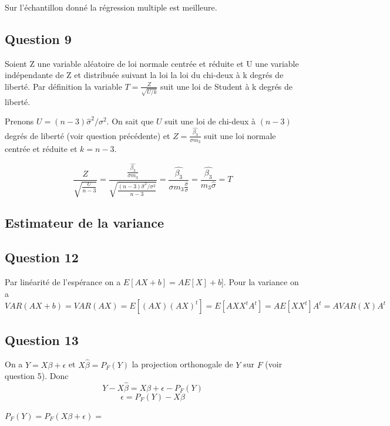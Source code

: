 \documentclass[]{book}
\theoremstyle{definition}
\begin{document}
Sur l'\'echantillon donn\'e la r\'egression multiple est meilleure. 

\subsection*{Question 9}
Soient Z une variable al\'eatoire de loi normale centr\'ee et r\'eduite et U une variable ind\'ependante de Z et distribu\'ee suivant la loi la loi du chi-deux \`a k degr\'es de libert\'e. Par d\'efinition la variable $T=\frac {Z}{\sqrt {U/k}}$ suit une loi de Student \`a k degr\'es de libert\'e.

Prenons $U = (n-3)\hat{\sigma}^2/\sigma^2$. On sait que $U$ suit une loi de chi-deux \`a $(n-3)$ degr\'es de libert\'e (voir question pr\'ec\'edente) et $Z = \frac{\hat{\beta_3}}{\sigma m_3}$ suit une loi normale centr\'ee et r\'eduite et $k = n-3$.

$$
\frac{Z}{\sqrt{\frac{U}{n-3}}} = \frac{\frac{\hat{\beta_3}}{\sigma m_3}}{\sqrt{\frac{(n-3)\hat{\sigma}^2/\sigma^2}{n-3}}}
= \frac{\hat{\beta_3}}{\sigma m_3 \frac{\hat{\sigma}}{\sigma}} 
= \frac{\hat{\beta_3}}{m_3 \hat{\sigma}} = T
$$

\subsection*{Estimateur de la variance}
\subsection*{Question 12}
Par lin\'earit\'e de l'esp\'erance on a $E[AX+b] = AE[X] + b$]. Pour la variance on a 
$$
VAR(AX+b) = VAR(AX) = E[(AX)(AX)^t] = E[AXX^tA^t] = AE[XX^t]A^t = AVAR(X)A^t
$$

\subsection*{Question 13}
On a $Y =  X\beta + \epsilon$ et $X\hat{\beta} = P_F(Y)$ la projection orthonogale de $Y$ sur $F$ (voir question 5).
Donc 
$$Y - X\hat{\beta} = X\beta + \epsilon - P_F(Y)$$
$$\epsilon = P_F(Y) - X\beta$$


$P_F(Y) = P_F(X\beta + \epsilon) = $
\end{document}
